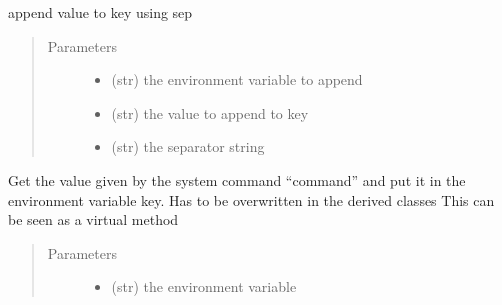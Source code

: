\documentclass[a4paper,10pt,english]{sphinxmanual}
\begin{document}
\begin{fulllineitems}
\begin{fulllineitems}
\begin{quote}
\begin{description}
\end{description}\end{quote}

\end{fulllineitems}


\begin{fulllineitems}
\label{\detokenize{apidoc_src/src:src.fileEnviron.ContextFileEnviron.append_value}}
append value to key using sep
\begin{quote}\begin{description}
\item[{Parameters}] \leavevmode\begin{itemize}
\item {} 
 \textendash{} (str) the environment variable to append

\item {} 
 \textendash{} (str) the value to append to key

\item {} 
 \textendash{} (str) the separator string

\end{itemize}

\end{description}\end{quote}

\end{fulllineitems}


\begin{fulllineitems}
\label{\detokenize{apidoc_src/src:src.fileEnviron.ContextFileEnviron.command_value}}
Get the value given by the system command “command” 
and put it in the environment variable key.
Has to be overwritten in the derived classes
This can be seen as a virtual method
\begin{quote}\begin{description}
\item[{Parameters}] \leavevmode\begin{itemize}
\item {} 
 \textendash{} (str) the environment variable


\end{itemize}
\end{description}
\end{quote}
\end{fulllineitems}
\end{fulllineitems}
\end{document}
